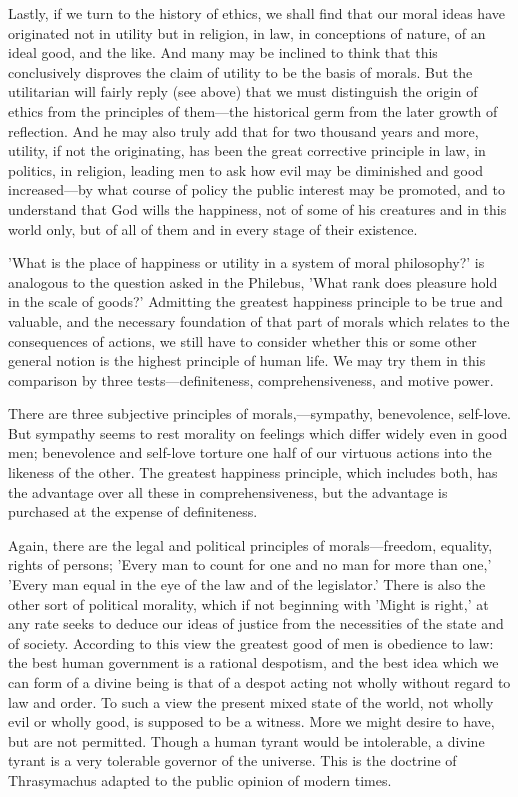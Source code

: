 \documentclass[11pt,letter]{article}
\begin{document}
\par  Lastly, if we turn to the history of ethics, we shall find that our moral ideas have originated not in utility but in religion, in law, in conceptions of nature, of an ideal good, and the like. And many may be inclined to think that this conclusively disproves the claim of utility to be the basis of morals. But the utilitarian will fairly reply (see above) that we must distinguish the origin of ethics from the principles of them—the historical germ from the later growth of reflection. And he may also truly add that for two thousand years and more, utility, if not the originating, has been the great corrective principle in law, in politics, in religion, leading men to ask how evil may be diminished and good increased—by what course of policy the public interest may be promoted, and to understand that God wills the happiness, not of some of his creatures and in this world only, but of all of them and in every stage of their existence.

\par  'What is the place of happiness or utility in a system of moral philosophy?' is analogous to the question asked in the Philebus, 'What rank does pleasure hold in the scale of goods?' Admitting the greatest happiness principle to be true and valuable, and the necessary foundation of that part of morals which relates to the consequences of actions, we still have to consider whether this or some other general notion is the highest principle of human life. We may try them in this comparison by three tests—definiteness, comprehensiveness, and motive power.

\par  There are three subjective principles of morals,—sympathy, benevolence, self-love. But sympathy seems to rest morality on feelings which differ widely even in good men; benevolence and self-love torture one half of our virtuous actions into the likeness of the other. The greatest happiness principle, which includes both, has the advantage over all these in comprehensiveness, but the advantage is purchased at the expense of definiteness.

\par  Again, there are the legal and political principles of morals—freedom, equality, rights of persons; 'Every man to count for one and no man for more than one,' 'Every man equal in the eye of the law and of the legislator.' There is also the other sort of political morality, which if not beginning with 'Might is right,' at any rate seeks to deduce our ideas of justice from the necessities of the state and of society. According to this view the greatest good of men is obedience to law: the best human government is a rational despotism, and the best idea which we can form of a divine being is that of a despot acting not wholly without regard to law and order. To such a view the present mixed state of the world, not wholly evil or wholly good, is supposed to be a witness. More we might desire to have, but are not permitted. Though a human tyrant would be intolerable, a divine tyrant is a very tolerable governor of the universe. This is the doctrine of Thrasymachus adapted to the public opinion of modern times.
\end{document}
